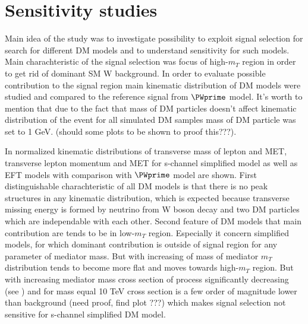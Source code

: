 \section{Sensitivity studies}

Main idea of the study was to investigate possibility to exploit signal selection for search for different DM models and to understand sensitivity for such models.
Main charachteristic of the signal selection was focus of high-$m_{T}$ region in order to get rid of dominant SM W background.
In order to evaluate possible contribution to the signal region main kinematic distribution of DM models were studied and compared to the reference signal from $\PWprime$ model.
It's worth to mention that due to the fact that mass of DM particles doesn't affect kinematic distribution of the event for all simulated DM samples mass of DM particle was set to 1 GeV.
(should some plots to be shown to proof this???).


In  normalized kinematic distributions of transverse mass of lepton and MET, transverse lepton momentum and MET 
for s-channel simplified model as well as EFT models with comparison with $\PWprime$ model are shown.
First distinguishable charachteristic of all DM models is that there is no peak structures in any kinematic distribution, which is expected because transverse missing energy is formed by
neutrino from W boson decay and two DM particles which are independable with each other. Second feature of DM models that main contribution are tends to be in low-$m_{T}$ region.
Especially it concern simplified models, for which dominant contribution is outside of signal region for any parameter of mediator mass.
But with increasing of mass of mediator $m_{T}$ distribution tends to become more flat and moves towards high-$m_{T}$ region.
But with increasing mediator mass cross section of process significantly decreasing (see ) 
and for mass equal 10 TeV cross section is a few order of magnitude lower than background (need proof, find plot ???) which makes signal selection not sensitive for s-channel simplified DM model.



